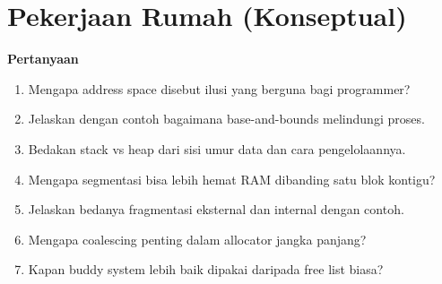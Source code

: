 \section*{Pekerjaan Rumah (Konseptual)}
\textbf{Pertanyaan}
\begin{enumerate}
    \item Mengapa address space disebut ilusi yang berguna bagi programmer?
    \item Jelaskan dengan contoh bagaimana base-and-bounds melindungi proses.
    \item Bedakan stack vs heap dari sisi umur data dan cara pengelolaannya.
    \item Mengapa segmentasi bisa lebih hemat RAM dibanding satu blok kontigu?
    \item Jelaskan bedanya fragmentasi eksternal dan internal dengan contoh.
    \item Mengapa coalescing penting dalam allocator jangka panjang?
    \item Kapan buddy system lebih baik dipakai daripada free list biasa?
\end{enumerate}
